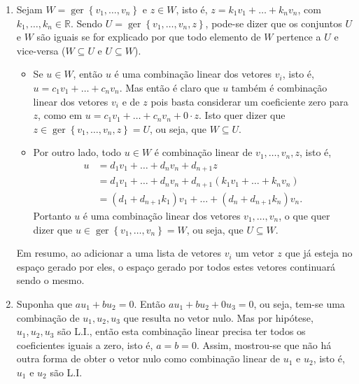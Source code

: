 \documentclass[12pt,a4paper]{article}
\newcommand*\ger[1]{\operatorname{ger}\left\{#1\right\}}
\newcommand*\R{\mathbb{R}}
\begin{document}
\begin{enumerate}
\item Sejam $W = \ger{ v_1, \ldots, v_n }$ e $z \in W$, isto é, $z = k_1 v_1 + \ldots + k_n v_n$, com $k_1, \ldots, k_n \in \R$. Sendo $U = \ger{ v_1, \ldots, v_n, z }$, pode-se dizer que os conjuntos $U$ e $W$ são iguais se for explicado por que todo elemento de $W$ pertence a $U$ e vice-versa ($W \subseteq U$ e $U \subseteq W$).
\begin{itemize}
\item
Se $u \in W$, então $u$ é uma combinação linear dos vetores $v_i$, isto é, $u = c_1 v_1 + \ldots + c_n v_n$. Mas então é claro que $u$ também é combinação linear dos vetores $v_i$ e de $z$ pois basta considerar um coeficiente zero para $z$, como em $u = c_1 v_1 + \ldots + c_n v_n + 0 \cdot z$. Isto quer dizer que $z \in \ger{ v_1, \ldots, v_n, z } = U$, ou seja, que $W \subseteq U$.
\item Por outro lado, todo $u \in W$ é combinação linear de $v_1, \ldots, v_n, z$, isto é,
\begin{align*}
u
& = d_1 v_1 + \ldots + d_n v_n + d_{n+1} z \\
& = d_1 v_1 + \ldots + d_n v_n + d_{n+1}(k_1 v_1 + \ldots + k_n v_n) \\
& = (d_1 + d_{n+1}k_1) v_1 + \ldots + ( d_n + d_{n+1}k_n) v_n.
\end{align*}
Portanto $u$ é uma combinação linear dos vetores $v_1, \ldots, v_n$, o que quer dizer que $u \in \ger{ v_1, \ldots, v_n } = W$, ou seja, que $U \subseteq W$.
\end{itemize}
Em resumo, ao adicionar a uma lista de vetores $v_i$ um vetor $z$ que já esteja no espaço gerado por eles, o espaço gerado por todos estes vetores continuará sendo o mesmo.

\item Suponha que $a u_1 + bu_2 = 0$. Então $a u_1 + b u_2 + 0 u_3= 0$, ou seja, tem-se uma combinação de $u_1, u_2, u_3$ que resulta no vetor nulo. Mas por hipótese, $u_1, u_2, u_3$ são L.I., então esta combinação linear precisa ter todos os coeficientes iguais a zero, isto é, $a=b=0$. Assim, mostrou-se que não há outra forma de obter o vetor nulo como combinação linear de $u_1$ e $u_2$, isto é, $u_1$ e $u_2$ são L.I.


\end{enumerate}
\end{document}
